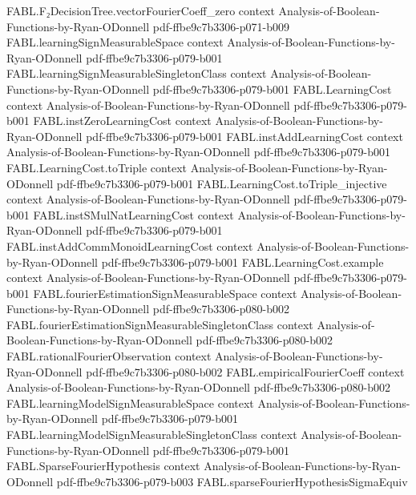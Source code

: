 \begin{theorem}
  {FABL.F₂DecisionTree.vectorFourierCoeff_zero}
  {context}
  {Analysis-of-Boolean-Functions-by-Ryan-ODonnell}
  {pdf-ffbe9c7b3306-p071-b009}
\proofstep
  {FABL.learningSignMeasurableSpace}
  {context}
  {Analysis-of-Boolean-Functions-by-Ryan-ODonnell}
  {pdf-ffbe9c7b3306-p079-b001}
\proofstep
  {FABL.learningSignMeasurableSingletonClass}
  {context}
  {Analysis-of-Boolean-Functions-by-Ryan-ODonnell}
  {pdf-ffbe9c7b3306-p079-b001}
\proofstep
  {FABL.LearningCost}
  {context}
  {Analysis-of-Boolean-Functions-by-Ryan-ODonnell}
  {pdf-ffbe9c7b3306-p079-b001}
\proofstep
  {FABL.instZeroLearningCost}
  {context}
  {Analysis-of-Boolean-Functions-by-Ryan-ODonnell}
  {pdf-ffbe9c7b3306-p079-b001}
\proofstep
  {FABL.instAddLearningCost}
  {context}
  {Analysis-of-Boolean-Functions-by-Ryan-ODonnell}
  {pdf-ffbe9c7b3306-p079-b001}
\proofstep
  {FABL.LearningCost.toTriple}
  {context}
  {Analysis-of-Boolean-Functions-by-Ryan-ODonnell}
  {pdf-ffbe9c7b3306-p079-b001}
\proofstep
  {FABL.LearningCost.toTriple_injective}
  {context}
  {Analysis-of-Boolean-Functions-by-Ryan-ODonnell}
  {pdf-ffbe9c7b3306-p079-b001}
\proofstep
  {FABL.instSMulNatLearningCost}
  {context}
  {Analysis-of-Boolean-Functions-by-Ryan-ODonnell}
  {pdf-ffbe9c7b3306-p079-b001}
\proofstep
  {FABL.instAddCommMonoidLearningCost}
  {context}
  {Analysis-of-Boolean-Functions-by-Ryan-ODonnell}
  {pdf-ffbe9c7b3306-p079-b001}
\proofstep
  {FABL.LearningCost.example}
  {context}
  {Analysis-of-Boolean-Functions-by-Ryan-ODonnell}
  {pdf-ffbe9c7b3306-p079-b001}
\proofstep
  {FABL.fourierEstimationSignMeasurableSpace}
  {context}
  {Analysis-of-Boolean-Functions-by-Ryan-ODonnell}
  {pdf-ffbe9c7b3306-p080-b002}
\proofstep
  {FABL.fourierEstimationSignMeasurableSingletonClass}
  {context}
  {Analysis-of-Boolean-Functions-by-Ryan-ODonnell}
  {pdf-ffbe9c7b3306-p080-b002}
\proofstep
  {FABL.rationalFourierObservation}
  {context}
  {Analysis-of-Boolean-Functions-by-Ryan-ODonnell}
  {pdf-ffbe9c7b3306-p080-b002}
\proofstep
  {FABL.empiricalFourierCoeff}
  {context}
  {Analysis-of-Boolean-Functions-by-Ryan-ODonnell}
  {pdf-ffbe9c7b3306-p080-b002}
\proofstep
  {FABL.learningModelSignMeasurableSpace}
  {context}
  {Analysis-of-Boolean-Functions-by-Ryan-ODonnell}
  {pdf-ffbe9c7b3306-p079-b001}
\proofstep
  {FABL.learningModelSignMeasurableSingletonClass}
  {context}
  {Analysis-of-Boolean-Functions-by-Ryan-ODonnell}
  {pdf-ffbe9c7b3306-p079-b001}
\proofstep
  {FABL.SparseFourierHypothesis}
  {context}
  {Analysis-of-Boolean-Functions-by-Ryan-ODonnell}
  {pdf-ffbe9c7b3306-p079-b003}
\proofstep
  {FABL.sparseFourierHypothesisSigmaEquiv}

\end{theorem}
